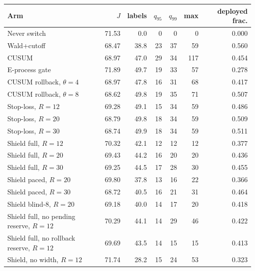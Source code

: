 \begin{tabular}{@{}l r r r r r r@{}}
\toprule
Arm & $J$ & labels & $q_{95}$ & $q_{99}$ & max & deployed frac. \\
\midrule
Never switch & 71.53 & 0.0 & 0 & 0 & 0 & 0.000 \\
Wald+cutoff & 68.47 & 38.8 & 23 & 37 & 59 & 0.560 \\
CUSUM & 68.97 & 47.0 & 29 & 34 & 117 & 0.454 \\
E-process gate & 71.89 & 49.7 & 19 & 33 & 57 & 0.278 \\
CUSUM rollback, $\theta=4$ & 68.97 & 47.8 & 16 & 31 & 68 & 0.417 \\
CUSUM rollback, $\theta=8$ & 68.62 & 49.8 & 19 & 35 & 71 & 0.507 \\
Stop-loss, $R=12$ & 69.28 & 49.1 & 15 & 34 & 59 & 0.486 \\
Stop-loss, $R=20$ & 68.79 & 49.8 & 18 & 34 & 59 & 0.509 \\
Stop-loss, $R=30$ & 68.74 & 49.9 & 18 & 34 & 59 & 0.511 \\
Shield full, $R=12$ & 70.32 & 42.1 & 12 & 12 & 12 & 0.377 \\
Shield full, $R=20$ & 69.43 & 44.2 & 16 & 20 & 20 & 0.436 \\
Shield full, $R=30$ & 69.25 & 44.5 & 17 & 28 & 30 & 0.455 \\
Shield paced, $R=20$ & 69.80 & 37.8 & 13 & 16 & 22 & 0.366 \\
Shield paced, $R=30$ & 68.72 & 40.5 & 16 & 21 & 31 & 0.464 \\
Shield blind-8, $R=20$ & 69.18 & 40.0 & 14 & 17 & 20 & 0.418 \\
Shield full, no pending reserve, $R=12$ & 70.29 & 44.1 & 14 & 29 & 46 & 0.422 \\
Shield full, no rollback reserve, $R=12$ & 69.69 & 43.5 & 14 & 15 & 15 & 0.413 \\
Shield, no width, $R=12$ & 71.74 & 28.2 & 15 & 24 & 53 & 0.323 \\
\bottomrule
\end{tabular}
